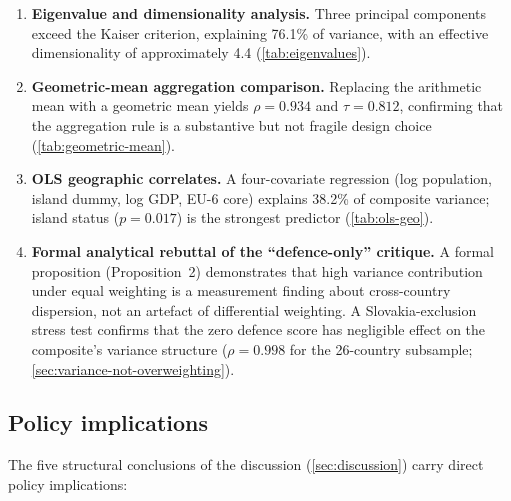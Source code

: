 \begin{enumerate}[leftmargin=2em]
  \item \textbf{Eigenvalue and dimensionality analysis.}
    Three principal components exceed the Kaiser criterion, explaining
    76.1\% of variance, with an effective dimensionality of
    approximately 4.4 (\cref{tab:eigenvalues}).

  \item \textbf{Geometric-mean aggregation comparison.}
    Replacing the arithmetic mean with a geometric mean yields
    $\rho = 0.934$ and $\tau = 0.812$, confirming that the
    aggregation rule is a substantive but not fragile design choice
    (\cref{tab:geometric-mean}).

  \item \textbf{OLS geographic correlates.}
    A four-covariate regression (log population, island dummy,
    log GDP, EU-6 core) explains 38.2\% of composite variance;
    island status ($p = 0.017$) is the strongest predictor
    (\cref{tab:ols-geo}).

  \item \textbf{Formal analytical rebuttal of the
    ``defence-only'' critique.}
    A formal proposition (Proposition~2) demonstrates that high
    variance contribution under equal weighting is a measurement
    finding about cross-country dispersion, not an artefact of
    differential weighting.  A Slovakia-exclusion stress test
    confirms that the zero defence score has negligible effect on
    the composite's variance structure ($\rho = 0.998$ for the
    26-country subsample; \cref{sec:variance-not-overweighting}).
\end{enumerate}

\subsection{Policy implications}

The five structural conclusions of the discussion
(\cref{sec:discussion}) carry direct policy implications:

